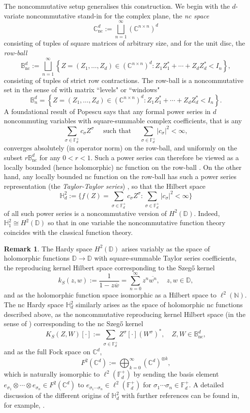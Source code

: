 \documentclass[11pt,reqno]{amsart}
\def\s{\sigma}
\def\NN{\mathbb{N}}
\def\CC{\mathbb{C}}
\def\DD{\mathbb{D}}
\def\BB{\mathbb{B}}
\def\FF{\mathbb{F}}
\def\HH{\mathbb{H}}
\def\nc{\mathrm{nc}}
\def\dju{\bigsqcup_{n=1}^{\infty}}
\theoremstyle{definition}
\newtheorem{remark}[theorem]{Remark}
\numberwithin{equation}{section}
\begin{document}
The noncommutative setup generalises this construction. We begin with the \(d\)-variate noncommutative stand-in for the complex plane, the \emph{nc space} 
\[
    \CC^d_{\nc} := \dju (\CC^{n\times n})^d
\]
consisting of tuples of square matrices of arbitrary size, and for the unit disc, the \emph{row-ball}
\[
    \BB^d_{\nc} := \dju \left\{Z = (Z_1, \ldots, Z_d) \in (\CC^{n\times n})^d : Z_1 Z_1^* + \cdots + Z_d Z_d^* < I_n \right\},
\]
consisting of tuples of strict row contractions. The row-ball is a noncommutative set in the sense of \cite{KVV14} with matrix ``levels" or ``windows"
\[
    \BB^d_n = \left\{Z = (Z_1, \ldots, Z_d) \in (\CC^{n\times n})^d : Z_1 Z_1^* + \cdots + Z_d Z_d^* < I_n \right\}.
\]
A foundational result of Popescu \cite{Pop06b} says that any formal power series in \(d\) noncommuting variables with square-summable complex coefficients, that is any
\[
    \sum_{\s \in \FF_d^+} c_\s Z^\s \quad \text{ such that } \quad \sum_{\s \in \FF_d^+} \lvert c_\s \rvert^2 < \infty,
\]
converges absolutely (in operator norm) on the row-ball, and uniformly on the subset \(r\BB^d_\nc\) for any \(0 < r < 1\). Such a power series can therefore be viewed as a locally bounded (hence holomorphic) nc function on the row-ball \cite[Chapter 8]{KVV14}. On the other hand, any locally bounded nc function on the row-ball has such a power series representation (the \emph{Taylor-Taylor series}) \cite[Chapter 7]{KVV14}, so that the Hilbert space
\[
    \HH^2_d := \{ f(Z) = \sum_{\s \in \FF_d^+} c_\s Z^\s : \sum_{\s \in \FF_d^+} \lvert c_\s \rvert^2 < \infty \}
\]
of all such power series is a noncommutative version of \(H^2(\DD)\). Indeed, \(\HH^2_1 \cong H^2(\DD)\) so that in one variable the noncommutative function theory coincides with the classical function theory.

\begin{remark}
    The Hardy space \(H^2(\DD)\) arises variably as the space of holomorphic functions \(\DD \to \DD\) with square-summable Taylor series coefficients, the reproducing kernel Hilbert space corresponding to the Szeg\H{o} kernel
    \[
        k_S(z,w) := \frac{1}{1-z\overline{w}} = \sum_{n=0}^{\infty} z^n \overline{w^n}, \quad z,w \in \DD,
    \]
    and as the holomorphic function space isomorphic as a Hilbert space to \(\ell^2(\NN)\). The nc Hardy space \(\HH^2_d\) similarly arises as the space of holomorphic nc functions described above, as the noncommutative reproducing kernel Hilbert space (in the sense of \cite{BMV16}) corresponding to the nc Szeg\H{o} kernel
    \[
        K_S(Z,W)[\cdot] := \sum_{\s \in \FF_d^+} Z^\s [\cdot] (W^\s)^*, \quad Z, W \in \BB^d_{\nc},
    \]
    and as the full Fock space on \(\CC^d\),
    \[
        F^2(\CC^d) := \bigoplus_{k=0}^{\infty} \left(\CC^d\right)^{\otimes k},
    \]
    which is naturally isomorphic to \(\ell^2(\FF_d^+)\) by sending the basis element \(e_{\s_1} \otimes \cdots \otimes e_{\s_n} \in F^2(\CC^d)\) to \(e_{\s_1\cdots\s_n} \in \ell^2(\FF_d^+)\) for \(\s_1 \cdots \s_n \in \FF_d^+\). A detailed discussion of the different origins of \(\HH^2_d\) with further references can be found in, for example, \cite{JM21}.
\end{remark}
\end{document}
